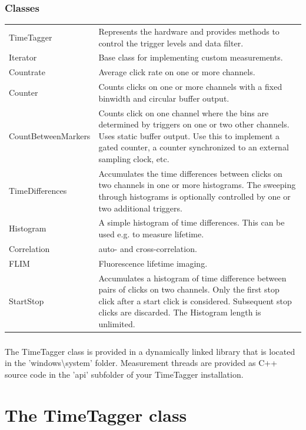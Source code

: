 \documentclass[oneside]{memoir}
\begin{document}
\subsubsection{Classes}
\begin{tabular}{p{}p{}}
  TimeTagger & Represents the hardware and provides methods to control the trigger levels and data filter.\\
  Iterator & Base class for implementing custom measurements.\\
  Countrate & Average click rate on one or more channels.\\
  Counter & Counts clicks on one or more channels with a fixed binwidth and
  circular buffer output.\\
  CountBetweenMarkers & Counts click on one channel where the bins are
  determined by triggers on one or two other channels. Uses static buffer
  output. Use this to implement a gated counter, a counter synchronized to
  an external sampling clock, etc.\\
  TimeDifferences & Accumulates the time differences between clicks on two
  channels in one or more histograms. The sweeping through
  histograms is optionally controlled by one or two additional triggers.\\
  Histogram & A simple histogram of time differences. This can be used e.g.
  to measure lifetime.\\
  Correlation & auto- and cross-correlation.\\
  FLIM & Fluorescence lifetime imaging.\\
  StartStop & Accumulates a histogram of time difference between
  pairs of clicks on two channels. Only the first stop click after a start click is
  considered. Subsequent stop clicks are discarded. The Histogram length is
  unlimited.\\
\end{tabular}
\subsubsection*{}
The TimeTagger class is provided in a dynamically linked library that is located in the
'windows{\textbackslash}system' folder. Measurement threads are provided as C++ source code in the
'api' subfolder of your TimeTagger installation.

\section{The TimeTagger class}
\end{document}
